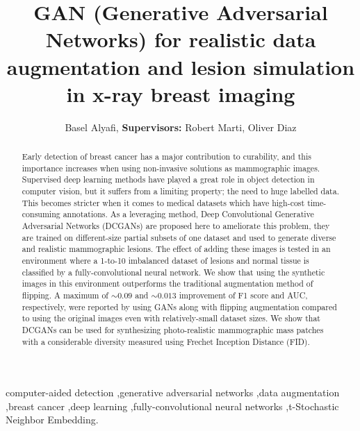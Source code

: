 \documentclass[final,3p,twocolumn,authoryear,sort&compress,times]{maia}
\begin{document}
\begin{frontmatter}

\title{GAN (Generative Adversarial Networks) for realistic data augmentation and lesion simulation in x-ray breast imaging}

\author{Basel Alyafi, \textbf{Supervisors: }Robert Marti, Oliver Diaz}
\address{Universitat de Girona, 17003, Girona, Spain}

\begin{abstract}
Early detection of breast cancer has a major contribution to curability, and this importance increases when using non-invasive solutions as mammographic images. Supervised deep learning methods have played a great role in object detection in computer vision, but it suffers from a limiting property; the need to huge labelled data. This becomes stricter when it comes to medical datasets which have high-cost time-consuming annotations. As a leveraging method, Deep Convolutional Generative Adversarial Networks (DCGANs) are proposed here to ameliorate this problem, they are trained on different-size partial subsets of one dataset and used to generate diverse and realistic mammographic lesions. The effect of adding these images is tested in an environment where a 1-to-10 imbalanced dataset of lesions and normal tissue is classified by a fully-convolutional neural network. We show that using the synthetic images in this environment outperforms the traditional augmentation method of flipping. A maximum of $\sim0.09$ and $\sim0.013$ improvement of F1 score and AUC, respectively, were reported by using GANs along with flipping augmentation compared to using the original images even with relatively-small dataset sizes. We show that DCGANs can be used for synthesizing photo-realistic mammographic mass patches with a considerable diversity measured using Frechet Inception Distance (FID). 
\end{abstract}

\begin{keyword}
computer-aided detection \sep generative adversarial networks \sep data augmentation \sep breast cancer \sep deep learning  \sep fully-convolutional neural networks \sep t-Stochastic Neighbor Embedding.
\end{keyword}

\end{frontmatter}
\end{document}
